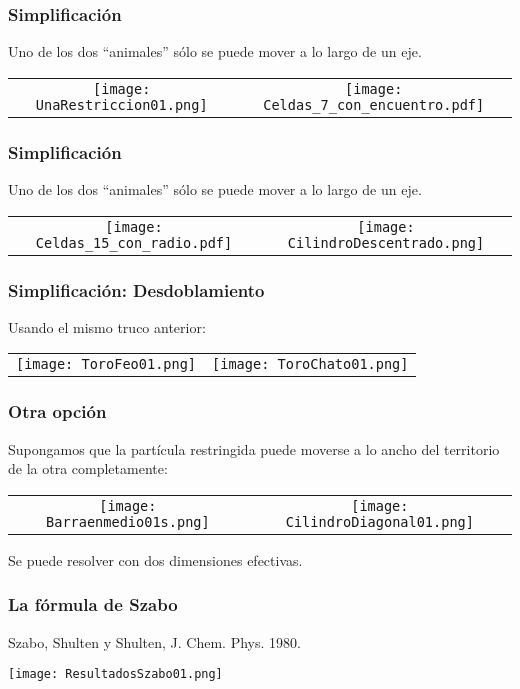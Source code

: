 \documentclass[mathserif,serif]{beamer}
\begin{document}
    
  \begin{frame}
    \frametitle{Simplificación}
    Uno de los dos ``animales'' sólo se puede mover a lo largo de un eje.
    \begin{tabular}{cc}
      \texttt{[image: UnaRestriccion01.png]} &
      \texttt{[image: Celdas\_7\_con\_encuentro.pdf]} 
    \end{tabular}
  \end{frame}

    
  \begin{frame}
    \frametitle{Simplificación}
    Uno de los dos ``animales'' sólo se puede mover a lo largo de un eje.
    \begin{tabular}{cc}
      \texttt{[image: Celdas\_15\_con\_radio.pdf]} &
       \texttt{[image: CilindroDescentrado.png]} 
     \end{tabular}
  \end{frame}

  
  \begin{frame}
    \frametitle{Simplificación: Desdoblamiento}
    Usando el mismo truco anterior:
    \begin{tabular}{cc}
      \texttt{[image: ToroFeo01.png]} & 
      \texttt{[image: ToroChato01.png]}  
    \end{tabular}
  \end{frame}



  \begin{frame}
    \frametitle{Otra opción}
    Supongamos que la partícula restringida puede moverse a lo ancho
    del territorio de la otra completamente:
    \begin{tabular}{cc}
      \texttt{[image: Barraenmedio01s.png]} & 
      \texttt{[image: CilindroDiagonal01.png]}  
    \end{tabular}
    Se puede resolver con dos dimensiones efectivas.
  \end{frame}
  

  \begin{frame}
    \frametitle{La fórmula de Szabo}
    Szabo, Shulten y Shulten, J. Chem. Phys. 1980.
     \begin{center}
      \texttt{[image: ResultadosSzabo01.png]}    
    \end{center}
  \end{frame}
  
\end{document}
